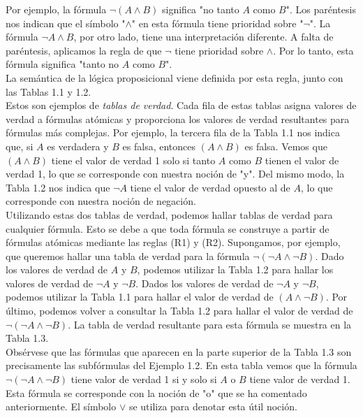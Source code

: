 \documentclass[12pt,a4paper]{book}
\newcommand{\comillas}[1]{"#1"}
\begin{document}
    Por ejemplo, la fórmula $\neg(A\wedge B)$ significa \comillas{no tanto $A$ como $B$}. Los paréntesis nos indican que el símbolo \comillas{$\wedge$}
    en esta fórmula tiene prioridad sobre \comillas{$\neg$}. La fórmula $\neg A\wedge B$, por otro lado, tiene una interpretación diferente. A falta
    de paréntesis, aplicamos la regla de que $\neg$ tiene prioridad sobre $\wedge$. Por lo tanto, esta fórmula significa \comillas{tanto no $A$ como $B$}.\\
    La semántica de la lógica proposicional viene definida por esta regla, junto con las Tablas 1.1 y 1.2.\\
    Estos son ejemplos de \textit{tablas de verdad}. Cada fila de estas tablas asigna valores de verdad a fórmulas atómicas y proporciona
    los valores de verdad resultantes para fórmulas más complejas. Por ejemplo, la tercera fila de la Tabla 1.1 nos indica que, si
    $A$ es verdadera y $B$ es falsa, entonces $(A\wedge B)$ es falsa. Vemos que $(A\wedge B)$ tiene el valor de verdad 1 solo si tanto $A$
    como $B$ tienen el valor de verdad 1, lo que se corresponde con nuestra noción de \comillas{y}. Del mismo modo, la Tabla 1.2 nos indica
    que $\neg A$ tiene el valor de verdad opuesto al de $A$, lo que corresponde con nuestra noción de negación.\\
    Utilizando estas dos tablas de verdad, podemos hallar tablas de verdad para cualquier fórmula. Esto se debe a que toda fórmula se
    construye a partir de fórmulas atómicas mediante las reglas (R1) y (R2). Supongamos, por ejemplo, que queremos hallar una tabla de verdad para la fórmula
    $\neg(\neg A\wedge \neg B)$. Dado los valores de verdad de $A$ y $B$, podemos utilizar la Tabla 1.2 para hallar los valores de verdad de
    $\neg A$ y $\neg B$. Dados los valores de verdad de $\neg A$ y $\neg B$, podemos utilizar la Tabla 1.1 para hallar el valor de verdad de
    $(A\wedge\neg B)$. Por último, podemos volver a consultar la Tabla 1.2 para hallar el valor de verdad de $\neg(\neg A\wedge\neg B)$. La
    tabla de verdad resultante para esta fórmula se muestra en la Tabla 1.3.\\
    Obsérvese que las fórmulas que aparecen en la parte superior de la Tabla 1.3 son precisamente las subfórmulas del Ejemplo 1.2.
    En esta tabla vemos que la fórmula $\neg(\neg A\wedge \neg B)$ tiene valor de verdad 1 si y solo si $A$ o $B$ tiene valor de verdad
    1. Esta fórmula se corresponde con la noción de \comillas{o} que se ha comentado anteriormente. El símbolo $\vee$ se utiliza para
    denotar esta útil noción.
\end{document}
